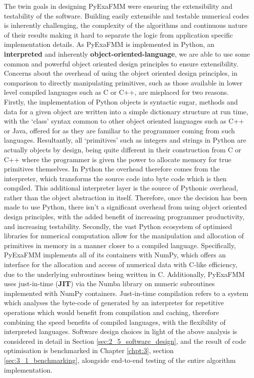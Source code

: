 The twin goals in designing \gls{PyExaFMM} were ensuring the extensibility and
testability of the software. Building easily extensible and testable numerical
codes is inherently challenging, the complexity of the algorithms and continuous
nature of their results making it hard to separate the logic from application
specific implementation details. As \gls{PyExaFMM} is implemented in Python, an
\textbf{\gls{interpreted}} and inherently \textbf{\gls{object-oriented-language}}, we are able to use some common and powerful
object oriented design principles to ensure extensibility. Concerns about the
overhead of using the object oriented design principles, in comparison to directly manipulating
primitives, such as those available in lower level compiled languages such as C
or C++, are misplaced for two reasons. Firstly, the implementation of Python objects
is syntactic sugar, methods and data for a given object are written into
a simple dictionary structure at run time, with the `class' syntax common to other
object oriented languages such as C++ or Java, offered for as they are familiar to
the programmer coming from such languages. Resultantly, all `primitives' such as
integers and strings in Python are actually objects by design, being quite different
in their construction from C or C++ where the programmer is given the power to
allocate memory for true primitives themselves. In Python the overhead therefore
comes from the interpreter, which transforms the source code into byte code which
is then compiled. This additional interpreter layer is the source of Pythonic overhead,
rather than the object abstraction in itself. Therefore, once the decision has
been made to use Python, there isn't a significant overhead from using object
oriented design principles, with the added benefit of increasing programmer
productivity, and increasing testability. Secondly, the vast Python ecosystem of
optimised libraries for numerical computation allow for the manipulation and
allocation of primitives in memory in a manner closer to a compiled language.
Specifically, \gls{PyExaFMM} implements all of its containers with NumPy, which
offers an interface for the allocation and access of numerical data with C-like
efficiency, due to the underlying subroutines being written in C. Additionally,
\gls{PyExaFMM} uses just-in-time (\textbf{\gls{JIT}}) via the Numba library on
numeric subroutines implemented with NumPy containers. Just-in-time compilation
refers to a system which analyses the byte-code of generated by an interpreter
for repetitive operations which would benefit from compilation and caching, therefore
combining the speed benefits of compiled languages, with the flexibility of interpreted
languages. Software design choices in light of the above analysis is considered
in detail in Section \ref{sec:2_5_software_design}, and the result of code
optimisation is benchmarked in Chapter \ref{chpt:3}, section \ref{sec:3_1_benchmarking},
alongside end-to-end testing of the entire algorithm implementation.

